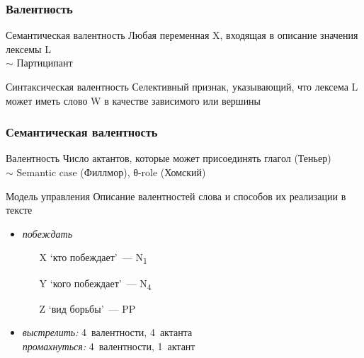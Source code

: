 \begin{frame}
  \frametitle{Валентность}

  \begin{alertblock}{Семантическая валентность}
    Любая переменная X, входящая в описание значения лексемы L \\
    $\sim$ Партиципант
  \end{alertblock}

  \begin{alertblock}{Синтаксическая валентность}
    Селективный признак, указывающий,
    что лексема L может иметь слово W в качестве зависимого или вершины
  \end{alertblock}

  \vfill

\end{frame}

\begin{frame}
  \frametitle{Семантическая валентность}

  \begin{alertblock}{Валентность}
    Число актантов, которые может присоединять глагол (Теньер) \\
    $\sim$ Semantic case (Филлмор), θ-role (Хомский)
  \end{alertblock}

  \begin{alertblock}{Модель управления}
    Описание валентностей слова и способов их реализации в тексте
  \end{alertblock}

  \begin{multicols}{2}
    \begin{itemize}
      \item<2-> \textit{побеждать} \begin{enumerate}
        \item[X] `кто побеждает'~--- N\textsubscript{1}
        \item[Y] `кого побеждает'~--- N\textsubscript{4}
        \item[Z] `вид борьбы'~--- PP
      \end{enumerate}
    \item<3->
      \textit{выстрелить:} 4~валентности, 4~актанта \\
      \textit{промахнуться:} 4~валентности, 1~актант
    \end{itemize}
  \end{multicols}
\end{frame}

